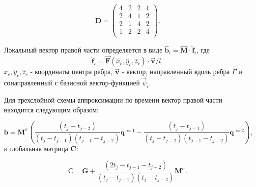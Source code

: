 \begin{equation*}
	\textbf{D} = \left(
	\begin{array}{rrrr}
		4 & 2 & 2 & 1 \\
		2 & 4 & 1 & 2 \\
		2 & 1 & 4 & 2 \\
		1 & 2 & 2 & 4 \\
	\end{array}
	\right).
\end{equation*}

Локальный вектор правой части определяется в виде $\hat{\textbf{b}}_i = \hat{\textbf{M}} \cdot \hat{\textbf{f}}_i$, где 
\begin{equation} \label{eq_1_17}
\hat{\textbf{f}}_i = \overrightarrow{\textbf{F}}(\hat{x}_c, \hat{y}_c, \hat{z}_c) \cdot \overrightarrow{\textbf{v}} / l,
\end{equation}
$\hat{x}_c, \hat{y}_c, \hat{z}_c$ - координаты центра ребра, $\overrightarrow{\textbf{v}}$ - вектор, направленный вдоль ребра $\Gamma$ и сонаправленный с базисной вектор-функцией $\overrightarrow{\psi}_i$.

Для трехслойной схемы аппроксимации по времени вектор правой части находится следующим образом:

\begin{equation} \label{eq_1_18}
	\textbf{b} = \textbf{M}^{\sigma} \left(\frac{(t_j - t_{j - 2})}{(t_j - t_{j - 1})(t_{j-1} - t_{j-2})} \textbf{q}^{\Leftarrow 1} - \frac{(t_j - t_{j - 1})}{(t_j - t_{j - 2})(t_{j-1} - t_{j-2})} \textbf{q}^{\Leftarrow 2}\right),
\end{equation}
а глобальная матрица $\textbf{C}$:

\begin{equation} \label{eq_1_18}
	\textbf{С} = \textbf{G} + \frac{(2t_j - t_{j-1} - t_{j-2})}{(t_j - t_{j-1})(t_{j} - t_{j-2})} \textbf{M}^{\sigma}.
\end{equation}

